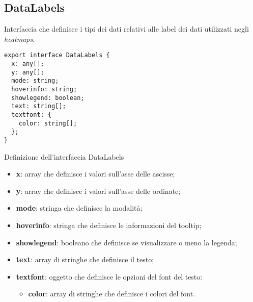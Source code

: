\subsection{DataLabels}
Interfaccia che definisce i tipi dei dati relativi alle label dei dati utilizzati negli \textit{heatmaps}.

\begin{verbatim}
export interface DataLabels {
  x: any[];
  y: any[];
  mode: string;
  hoverinfo: string;
  showlegend: boolean;
  text: string[];
  textfont: {
    color: string[];
  };
}
\end{verbatim}
\begin{listing}[H]
      \caption{Definizione dell'interfaccia DataLabels}
      \label{listing:dataLabels}
\end{listing}
\begin{itemize}
      \item \textbf{x}: array che definisce i valori sull'asse delle ascisse;
      \item \textbf{y}: array che definisce i valori sull'asse delle ordinate;
      \item \textbf{mode}: stringa che definisce la modalità;
      \item \textbf{hoverinfo}: stringa che definisce le informazioni del tooltip;
      \item \textbf{showlegend}: booleano che definisce se visualizzare o meno la legenda;
      \item \textbf{text}: array di stringhe che definisce il testo;
      \item \textbf{textfont}: oggetto che definisce le opzioni del font del testo:
            \begin{itemize}
                  \item \textbf{color}: array di stringhe che definisce i colori del font.
            \end{itemize}
\end{itemize}

